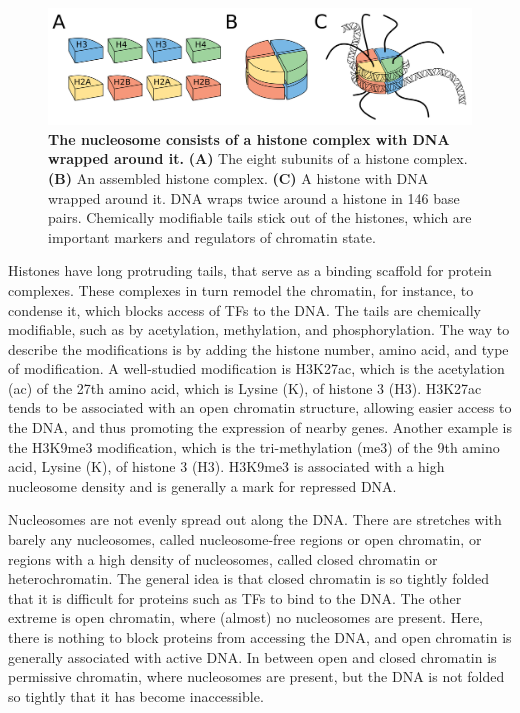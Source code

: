 \begin{figure}
    \center
    \includegraphics[width=0.8\linewidth]{ch.introduction/imgs/histones.png}
    \caption{\textbf{The nucleosome consists of a histone complex with DNA wrapped around it.} \textbf{(A)} The eight subunits of a histone complex. \textbf{(B)} An assembled histone complex. \textbf{(C)} A histone with DNA wrapped around it. DNA wraps twice around a histone in 146 base pairs. Chemically modifiable tails stick out of the histones, which are important markers and regulators of chromatin state.}
    \label{fig:histones}
\end{figure}

Histones have long protruding tails, that serve as a binding scaffold for protein complexes. These complexes in turn remodel the chromatin, for instance, to condense it, which blocks access of TFs to the DNA. The tails are chemically modifiable, such as by acetylation, methylation, and phosphorylation. The way to describe the modifications is by adding the histone number, amino acid, and type of modification. A well-studied modification is H3K27ac, which is the acetylation (ac) of the 27th amino acid, which is Lysine (K), of histone 3 (H3). H3K27ac tends to be associated with an open chromatin structure, allowing easier access to the DNA, and thus promoting the expression of nearby genes\cite{Creyghton2010}. Another example is the H3K9me3 modification, which is the tri-methylation (me3) of the 9th amino acid, Lysine (K), of histone 3 (H3). H3K9me3 is associated with a high nucleosome density and is generally a mark for repressed DNA\cite{Barski2007}.

Nucleosomes are not evenly spread out along the DNA. There are stretches with barely any nucleosomes, called nucleosome-free regions or open chromatin, or regions with a high density of nucleosomes, called closed chromatin or heterochromatin. The general idea is that closed chromatin is so tightly folded that it is difficult for proteins such as TFs to bind to the DNA. The other extreme is open chromatin, where (almost) no nucleosomes are present. Here, there is nothing to block proteins from accessing the DNA, and open chromatin is generally associated with active DNA\cite{Klemm2019}. In between open and closed chromatin is permissive chromatin, where nucleosomes are present, but the DNA is not folded so tightly that it has become inaccessible. 

